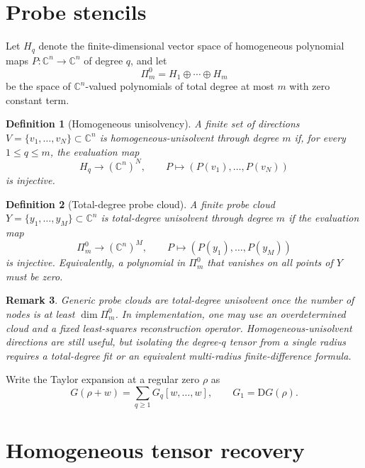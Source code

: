 \documentclass[11pt]{article}
\newtheorem{definition}{Definition}[section]
\newtheorem{remark}[definition]{Remark}
\newcommand{\C}{\mathbb C}
\newcommand{\D}{\mathrm D}
\begin{document}
\section{Probe stencils}

Let \(H_q\) denote the finite-dimensional vector space of homogeneous polynomial maps \(P:\C^n\to\C^n\) of degree \(q\), and let
\[
        \Pi_m^0=H_1\oplus\cdots\oplus H_m
\]
be the space of \(\C^n\)-valued polynomials of total degree at most \(m\) with zero constant term.

\begin{definition}[Homogeneous unisolvency]
A finite set of directions \(V=\{v_1,\ldots,v_N\}\subset\C^n\) is homogeneous-unisolvent through degree \(m\) if, for every \(1\le q\le m\), the evaluation map
\[
        H_q\to(\C^n)^N,\qquad P\mapsto(P(v_1),\ldots,P(v_N))
\]
is injective.
\end{definition}

\begin{definition}[Total-degree probe cloud]
A finite probe cloud \(Y=\{y_1,\ldots,y_M\}\subset\C^n\) is total-degree unisolvent through degree \(m\) if the evaluation map
\[
        \Pi_m^0\to(\C^n)^M,
        \qquad P\mapsto(P(y_1),\ldots,P(y_M))
\]
is injective.
Equivalently, a polynomial in \(\Pi_m^0\) that vanishes on all points of \(Y\) must be zero.
\end{definition}

\begin{remark}
Generic probe clouds are total-degree unisolvent once the number of nodes is at least \(\dim \Pi_m^0\). In implementation, one may use an overdetermined cloud and a fixed least-squares reconstruction operator. Homogeneous-unisolvent directions are still useful, but isolating the degree-\(q\) tensor from a single radius requires a total-degree fit or an equivalent multi-radius finite-difference formula.
\end{remark}

Write the Taylor expansion at a regular zero \(\rho\) as
\[
        G(\rho+w)=\sum_{q\ge1}G_q[w,\ldots,w],
        \qquad G_1=\D G(\rho).
\]

\section{Homogeneous tensor recovery}
\end{document}
